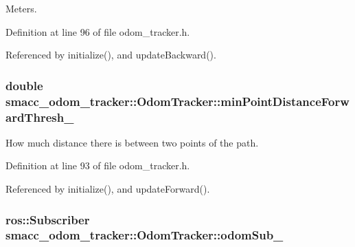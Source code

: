 Meters. 



Definition at line 96 of file odom\+\_\+tracker.\+h.



Referenced by initialize(), and update\+Backward().

\subsubsection[{\texorpdfstring{min\+Point\+Distance\+Forward\+Thresh\+\_\+}{minPointDistanceForwardThresh_}}]{\setlength{\rightskip}{0pt plus 5cm}double smacc\+\_\+odom\+\_\+tracker\+::\+Odom\+Tracker\+::min\+Point\+Distance\+Forward\+Thresh\+\_\+\hspace{0.3cm}{\ttfamily [protected]}}\hypertarget{classsmacc__odom__tracker_1_1OdomTracker_a0017d7740d99c2cc8ba946495b96ce41}{}\label{classsmacc__odom__tracker_1_1OdomTracker_a0017d7740d99c2cc8ba946495b96ce41}


How much distance there is between two points of the path. 



Definition at line 93 of file odom\+\_\+tracker.\+h.



Referenced by initialize(), and update\+Forward().

\subsubsection[{\texorpdfstring{odom\+Sub\+\_\+}{odomSub_}}]{\setlength{\rightskip}{0pt plus 5cm}ros\+::\+Subscriber smacc\+\_\+odom\+\_\+tracker\+::\+Odom\+Tracker\+::odom\+Sub\+\_\+\hspace{0.3cm}{\ttfamily [protected]}}\hypertarget{classsmacc__odom__tracker_1_1OdomTracker_a901bd60f4c1d21537a160d034ff504ef}{}\label{classsmacc__odom__tracker_1_1OdomTracker_a901bd60f4c1d21537a160d034ff504ef}


